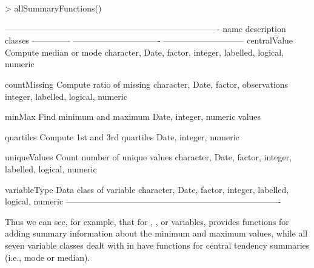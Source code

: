\documentclass[article,shortnames]{jss}
\newcommand{\R}[1]{\code{#1}}
\begin{document}


\begin{Schunk}
\begin{Sinput}
> allSummaryFunctions()
\end{Sinput}
\begin{Soutput}
----------------------------------------------------------------------------
name           description                     classes                      
-------------- ------------------------------- -----------------------------
centralValue   Compute median or mode          character, Date, factor,     
                                               integer, labelled, logical,  
                                               numeric                      

countMissing   Compute ratio of missing        character, Date, factor,     
               observations                    integer, labelled, logical,  
                                               numeric                      

minMax         Find minimum and maximum        Date, integer, numeric        
               values                                                       

quartiles      Compute 1st and 3rd quartiles   Date, integer, numeric       

uniqueValues   Count number of unique values   character, Date, factor,     
                                               integer, labelled, logical,  
                                               numeric                      

variableType   Data class of variable          character, Date, factor,     
                                               integer, labelled, logical,  
                                               numeric                      
----------------------------------------------------------------------------
\end{Soutput}
\end{Schunk}

Thus we can see, for example, that for \R{numeric}, \R{integer}, or \R{Date} 
variables,  provides functions for adding summary information about 
the minimum and maximum values, while all seven variable
classes dealt with in  have functions for central
tendency summaries (i.e., mode or median).
\end{document}
